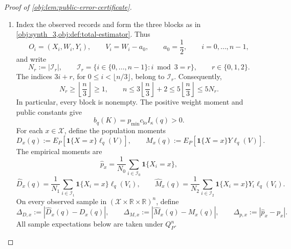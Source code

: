 \documentclass[11pt]{article}
\begin{document}
\begin{proof}[Proof of \cref{obj:lem:public-error-certificate}]
\begin{enumerate}
\item
Index the observed records and form the three blocks as in
\cref{obj:synth_3,obj:def:total-estimator}. Thus
\[
O_i=(X_i,W_i,Y_i),\qquad V_i=W_i-a_0,\qquad a_0=\frac12,
\qquad i=0,\ldots,n-1,
\]
and write
\[
N_r:=|\mathcal I_r|,
\qquad
\mathcal I_r=\{i\in\{0,\ldots,n-1\}:i\bmod3=r\},
\qquad r\in\{0,1,2\}.
\]
The indices \(3i+r\), for \(0\le i<\lfloor n/3\rfloor\), belong to
\(\mathcal I_r\). Consequently,
\[
N_r\ge\left\lfloor\frac n3\right\rfloor\ge1,
\qquad
n\le3\left\lfloor\frac n3\right\rfloor+2
\le5\left\lfloor\frac n3\right\rfloor
\le5N_r.
\]
In particular, every block is nonempty. The positive weight moment and public constants give
\[
b_q(K)=p_{\min}c_{\mathrm{lo}}I_\kappa(q)>0.
\]
For each \(x\in\mathcal X\), define the population moments
\[
D_x(q):=E_P[\mathbf1\{X=x\}\ell_q(V)],
\qquad
M_x(q):=E_P[\mathbf1\{X=x\}Y\ell_q(V)].
\]
The empirical moments are
\[
\widehat p_x=\frac1{N_0}\sum_{i\in\mathcal I_0}\mathbf1\{X_i=x\},
\]
\[
\widehat D_x(q)=\frac1{N_1}\sum_{i\in\mathcal I_1}
\mathbf1\{X_i=x\}\ell_q(V_i),
\qquad
\widehat M_x(q)=\frac1{N_2}\sum_{i\in\mathcal I_2}
\mathbf1\{X_i=x\}Y_i\ell_q(V_i).
\]
On every observed sample in \((\mathcal X\times\mathbb R\times\mathbb R)^n\), define
\[
\Delta_{D,x}:=|\widehat D_x(q)-D_x(q)|,\qquad
\Delta_{M,x}:=|\widehat M_x(q)-M_x(q)|,\qquad
\Delta_{p,x}:=|\widehat p_x-p_x|.
\]
All sample expectations below are taken under \(Q_P^n\).


\end{enumerate}
\end{proof}
\end{document}
